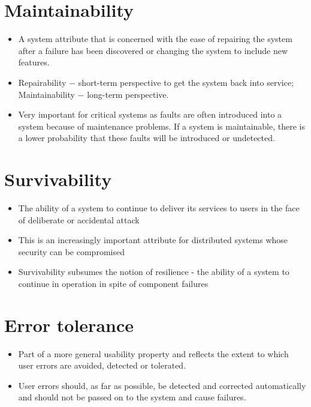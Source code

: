 \section{Maintainability}
\begin{itemize}
\item A system attribute that is concerned with the ease of repairing the system after a failure has been discovered or changing the system to include new features.
\item Repairability $-$ short-term perspective to get the system back into service; Maintainability $-$ long-term perspective.
\item Very important for critical systems as faults are often introduced into a system because of maintenance problems. If a system is maintainable, there is a lower probability that these faults will be introduced or undetected.
\end{itemize}

\section{Survivability}
\begin{itemize}
\item The ability of a system to continue to deliver its services to users in the face of deliberate or accidental attack

\item This is an increasingly important attribute for distributed systems whose security can be compromised

\item Survivability subsumes the notion of resilience - the ability of a system to continue in operation in spite of component failures

\end{itemize}
\section{Error tolerance}
\begin{itemize}
\item Part of a more general usability property and reflects the extent to which user errors are avoided, detected or tolerated.

\item User errors should, as far as possible, be detected and corrected automatically and should not be passed on to the system and cause failures.


\end{itemize}
